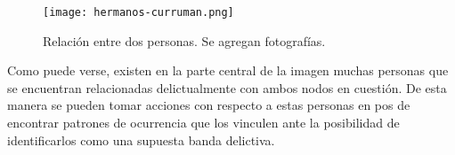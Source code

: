 \begin{figure}
	\texttt{[image: hermanos-curruman.png]}
	\caption{Relación entre dos personas. Se agregan fotografías.} 
	\label{fig:hermanos-curruman}
\end{figure}

Como puede verse, existen en la parte central de la imagen muchas personas que se encuentran relacionadas delictualmente con ambos nodos en cuestión. De esta manera se pueden tomar acciones con respecto a estas personas en pos de encontrar patrones de ocurrencia que los vinculen ante la posibilidad de identificarlos como una supuesta banda delictiva. 
